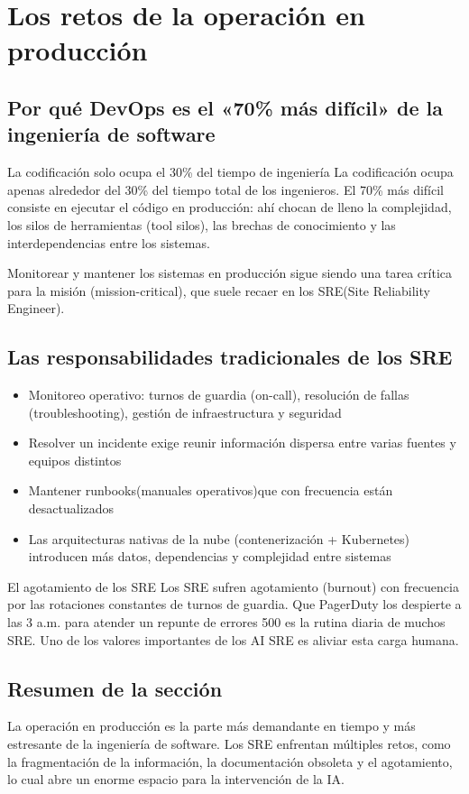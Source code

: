 \section{Los retos de la operación en producción}

\subsection{Por qué DevOps es el «70\% más difícil» de la ingeniería de software}

\begin{importantbox}{La codificación solo ocupa el 30\% del tiempo de ingeniería}
La codificación ocupa apenas alrededor del 30\% del tiempo total de los ingenieros. El 70\% más difícil consiste en ejecutar el código en producción: ahí chocan de lleno la complejidad, los silos de herramientas (tool silos), las brechas de conocimiento y las interdependencias entre los sistemas.
\end{importantbox}

Monitorear y mantener los sistemas en producción sigue siendo una tarea crítica para la misión (mission-critical), que suele recaer en los SRE(Site Reliability Engineer).

\subsection{Las responsabilidades tradicionales de los SRE}

\begin{itemize}
    \item Monitoreo operativo: turnos de guardia (on-call), resolución de fallas (troubleshooting), gestión de infraestructura y seguridad
    \item Resolver un incidente exige reunir información dispersa entre varias fuentes y equipos distintos
    \item Mantener runbooks(manuales operativos)que con frecuencia están desactualizados
    \item Las arquitecturas nativas de la nube (contenerización + Kubernetes) introducen más datos, dependencias y complejidad entre sistemas
\end{itemize}

\begin{warningbox}{El agotamiento de los SRE}
Los SRE sufren agotamiento (burnout) con frecuencia por las rotaciones constantes de turnos de guardia. Que PagerDuty los despierte a las 3 a.m. para atender un repunte de errores 500 es la rutina diaria de muchos SRE. Uno de los valores importantes de los AI SRE es aliviar esta carga humana.
\end{warningbox}

\subsection{Resumen de la sección}

La operación en producción es la parte más demandante en tiempo y más estresante de la ingeniería de software. Los SRE enfrentan múltiples retos, como la fragmentación de la información, la documentación obsoleta y el agotamiento, lo cual abre un enorme espacio para la intervención de la IA.

